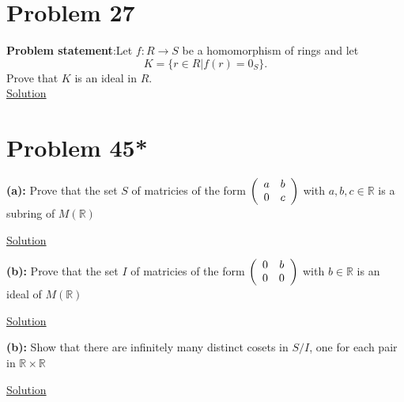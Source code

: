 \documentclass{article} %
\begin{document}
\section*{Problem 27}


\textbf{Problem statement}:Let $f:R \rightarrow S$ be a homomorphism of rings and let \[K=\{r \in R|f(r)=0_S\}.\] Prove that $K$ is an ideal in $R$. 
\\

\underline{Solution}
\begin{addmargin}[1em]{0em}

\end{addmargin}

\newpage

\section*{Problem 45*}


\textbf{(a): }Prove that the set $S$ of matricies of the form $\left( \begin{array}{c c} a & b \\ 0 & c \end{array} \right)$ with $a,b,c \in \mathbb{R}$ is a subring of $M(\mathbb{R})$
\\
\begin{addmargin}[1em]{0em}
\underline{Solution}
\begin{addmargin}[1em]{0em}

\end{addmargin}
\end{addmargin}

\textbf{(b): }Prove that the set $I$ of matricies of the form $\left( \begin{array}{c c} 0 & b \\ 0 & 0 \end{array} \right)$ with $b \in \mathbb{R}$ is an ideal of $M(\mathbb{R})$
\\
\begin{addmargin}[1em]{0em}
\underline{Solution}
\begin{addmargin}[1em]{0em}

\end{addmargin}
\end{addmargin}

\textbf{(b): }Show that there are infinitely many distinct cosets in $S/I$, one for each pair in $\mathbb{R} \times \mathbb{R}$
\\
\begin{addmargin}[1em]{0em}
\underline{Solution}
\begin{addmargin}[1em]{0em}

\end{addmargin}
\end{addmargin}
\newpage
\end{document}
